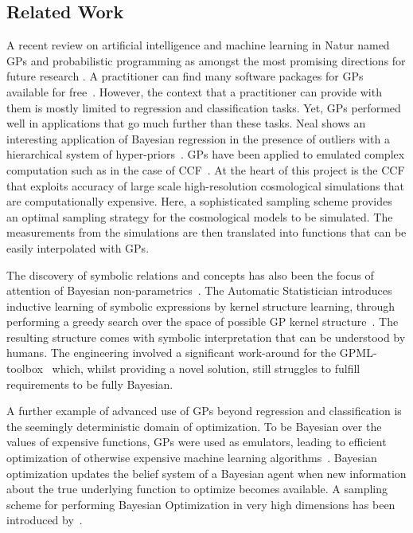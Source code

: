 \subsection{Related Work}
A recent review on artificial intelligence and machine learning in Natur named
\ac{GP}s and probabilistic programming as amongst the most promising directions for 
future research \citep{ghahramani2015probabilistic}. A practitioner can find many software packages
for \ac{GP}s available for free~\citep[e.g.][]{rasmussen2010gaussian,gpy2014,PyGPs}.
However, the context that a practitioner can provide with them is mostly limited to regression and
classification tasks. Yet, \ac{GP}s performed well in applications that go much
further than these tasks. Neal shows an interesting application of Bayesian regression in
the presence of outliers with a hierarchical system of hyper-priors~\citet{neal1997monte}.
\ac{GP}s have been applied to emulated complex computation such as in the case of
\ac{CCF}~\citep{kwan2013cosmic}. At the heart of this project is the
\ac{CCF} that exploits accuracy of large scale  high-resolution cosmological
simulations that are computationally expensive. Here, a sophisticated sampling scheme
provides an optimal sampling strategy for the cosmological models to be
simulated. The measurements from the simulations are then translated into functions that can
be easily interpolated with \ac{GP}s.

The discovery of symbolic relations and concepts has also been the
focus of attention of Bayesian non-parametrics~\citep[e.g.][]{kemp2006learning}.
The Automatic Statistician introduces inductive learning of
symbolic expressions by kernel structure learning, through performing a greedy search over
the space of possible \ac{GP} kernel
structure~\citep{duvenaud2013structure,lloyd2014automatic}. The resulting
structure comes with symbolic interpretation that can be understood by humans. The
engineering involved a significant work-around for the
GPML-toolbox~\citep{rasmussen2010gaussian} which, whilst providing a novel
solution, still struggles to fulfill requirements to be fully Bayesian.

A further example of advanced use of \ac{GP}s beyond regression and
classification is the seemingly deterministic domain of
optimization. To be Bayesian over the values of expensive functions, \ac{GP}s were used
as emulators, leading to efficient optimization of otherwise expensive machine learning algorithms~\citep{snoek2012practical}. Bayesian optimization
updates the belief system of a Bayesian agent when new information about the
true underlying function to optimize becomes available. A sampling scheme for
performing Bayesian Optimization in very high dimensions has been introduced
by~\citep{mahendran2012adaptive}.  


